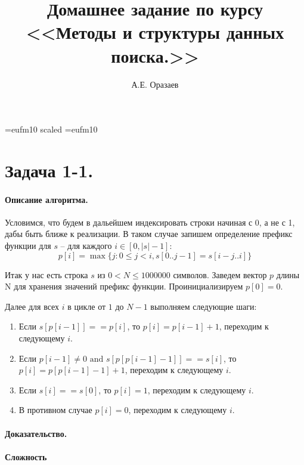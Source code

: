 \documentclass[12pt]{article}
\title{\bf Домашнее задание по курсу \\ <<Методы
и структуры данных поиска.>>}
\author{А.Е. Оразаев}
\date{}
\begin{document}
\voffset=-20mm
\hoffset=-12mm
\font\Got=eufm10 scaled \font\Got=eufm10

\maketitle

\section{Задача 1-1.}
\paragraph{Описание алгоритма.}
Условимся, что будем в дальейшем индексировать строки начиная с 0,
а не с 1, дабы быть ближе к реализации. В таком случае запишем определение
префикс функции для $ s $ -- для каждого $ i \in [0, |s| - 1] $:
$$
    p[i] = \max\{j: 0 \le j < i, s[0 .. j - 1] = s[i - j .. i]\}
$$

Итак у нас есть строка $ s $ из $ 0 < N \le 1000000$ символов.
Заведем вектор $ p $ длины N для хранения значений префикс функции.
Проинициализируем $ p[0] = 0 $.

Далее для всех $ i $ в цикле от $ 1 $ до $ N - 1 $ выполняем следующие шаги:
\begin{enumerate}
    \item Если $ s[p[i - 1]] == p[i] $, то $ p[i] = p[i - 1] + 1 $, переходим
          к следующему $ i $.
    \item Если $ p[i - 1] \ne 0 \mbox{  and  } s[p[p[i - 1] - 1]] == s[i] $, то
          $ p[i] = p[p[i - 1] - 1] + 1 $, переходим к следующему $ i $.
    \item Если $ s[i] == s[0] $, то $ p[i] = 1 $, переходим к следующему
          $ i $.
    \item В противном случае $ p[i] = 0 $, переходим к следующему $ i $.
\end{enumerate}



\paragraph{Доказательство.}

\paragraph{Сложность}
\end{document}
